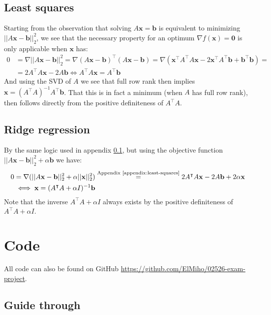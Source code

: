 \documentclass{article}
\begin{document}
\subsection{Least squares}\label{appendix:least-squares}
Starting from the observation that solving $A\mathbf{x} = \mathbf{b}$ is equivalent to minimizing $||A\mathbf{x} - \mathbf{b}||_2^{2}$, we see that the necessary property for an optimum $\nabla f(\mathbf{x}) = \mathbf{0}$ is only applicable when $\mathbf{x}$ has:
\begin{align}
    0 &= \nabla ||A\mathbf{x} - \mathbf{b}||_2^{2} = \nabla (A\mathbf{x} - \mathbf{b})^\intercal (A\mathbf{x} - \mathbf{b}) = \nabla \left(\mathbf{x}^\intercal A^\intercal A \mathbf{x} - 2\mathbf{x}^\intercal A^\intercal \mathbf{b} + \mathbf{b}^\intercal \mathbf{b} \right) =  \\
    &= 2A^\intercal A \mathbf{x} - 2A\mathbf{b} \iff A^\intercal A \mathbf{x} = A^\intercal\mathbf{b}
\end{align}
And using the SVD of $A$ we see that full row rank then implies $\mathbf{x} = (A^\intercal A)^{-1} A^\intercal\mathbf{b}$. That this is in fact a minimum (when $A$ has full row rank), then follows directly from the positive definiteness of $A^\intercal A$.

\subsection{Ridge regression}\label{appendix:ridge-time}
By the same logic used in appendix \ref{appendix:least-squares}, but using the objective function $||A\mathbf{x} - \mathbf{b}||_2^2 + \alpha \mathbf{b}$ we have:
\begin{align}
    0 &= \nabla (||A\mathbf{x} - \mathbf{b}||_2^{2} + \alpha ||\mathbf{x}||_2^{2}) \stackrel{\textrm{Appendix \ref{appendix:least-squares}}}{=} 2A^\intercal A \mathbf{x} - 2A\mathbf{b} + 2\alpha \mathbf{x} \\
    &\iff \mathbf{x} = (A^\intercal A + \alpha I)^{-1} \mathbf{b}
\end{align}
Note that the inverse $A^\intercal A + \alpha I$ always exists by the positive definiteness of $A^\intercal A + \alpha I$.


\section{Code}
All code can also be found on GitHub \url{https://github.com/ElMiho/02526-exam-project}. 

\subsection{Guide through}\label{appendix:guide-through}

\end{document}
